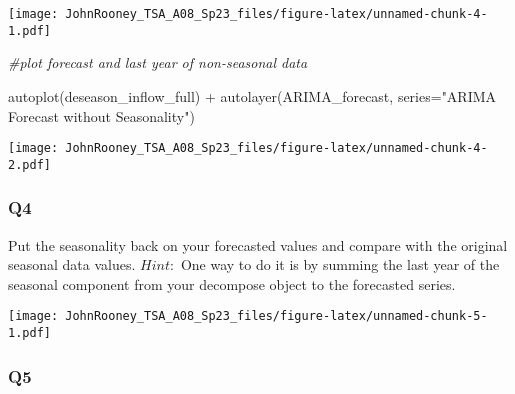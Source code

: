 \documentclass[
]{article}
\newenvironment{Shaded}{\begin{snugshade}}{\end{snugshade}}
\newcommand{\AttributeTok}[1]{\textcolor[rgb]{0.77,0.63,0.00}{#1}}
\newcommand{\CommentTok}[1]{\textcolor[rgb]{0.56,0.35,0.01}{\textit{#1}}}
\newcommand{\DecValTok}[1]{\textcolor[rgb]{0.00,0.00,0.81}{#1}}
\newcommand{\FunctionTok}[1]{\textcolor[rgb]{0.00,0.00,0.00}{#1}}
\newcommand{\NormalTok}[1]{#1}
\newcommand{\OtherTok}[1]{\textcolor[rgb]{0.56,0.35,0.01}{#1}}
\newcommand{\SpecialCharTok}[1]{\textcolor[rgb]{0.00,0.00,0.00}{#1}}
\newcommand{\StringTok}[1]{\textcolor[rgb]{0.31,0.60,0.02}{#1}}
\begin{document}
\texttt{[image: JohnRooney\_TSA\_A08\_Sp23\_files/figure-latex/unnamed-chunk-4-1.pdf]}

\begin{Shaded}
\begin{Highlighting}[]
\CommentTok{\#plot forecast and last year of non{-}seasonal data}

\FunctionTok{autoplot}\NormalTok{(deseason\_inflow\_full) }\SpecialCharTok{+}
  \FunctionTok{autolayer}\NormalTok{(ARIMA\_forecast, }\AttributeTok{series=}\StringTok{"ARIMA Forecast without Seasonality"}\NormalTok{)}
\end{Highlighting}
\end{Shaded}

\texttt{[image: JohnRooney\_TSA\_A08\_Sp23\_files/figure-latex/unnamed-chunk-4-2.pdf]}

\hypertarget{q4}{%
\subsubsection{Q4}\label{q4}}

Put the seasonality back on your forecasted values and compare with the
original seasonal data values. \(Hint:\) One way to do it is by summing
the last year of the seasonal component from your decompose object to
the forecasted series.

\begin{Shaded}
\end{Shaded}

\texttt{[image: JohnRooney\_TSA\_A08\_Sp23\_files/figure-latex/unnamed-chunk-5-1.pdf]}

\hypertarget{q5}{%
\subsubsection{Q5}\label{q5}}
\end{document}
